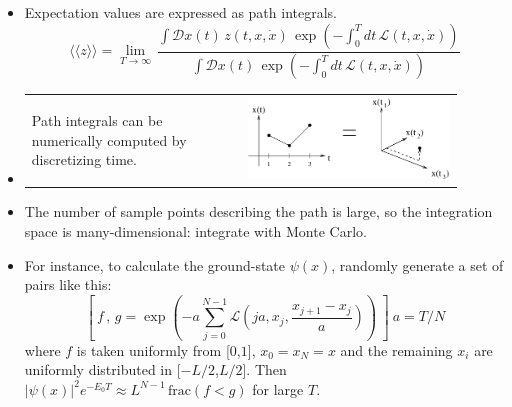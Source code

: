 \begin{slide*}

\slideframe{}
\LARGE


\vfill

\begin{itemize}

  \item Expectation values are expressed as path integrals.
\[ \langle\langle z \rangle\rangle =
   \lim_{T \to \infty} \, 
   \frac{\displaystyle \int {\mathcal D} x(t) \, z(t,x,\dot{x}) \,
   \exp \left(-\int_0^T dt \, {\mathcal L}(t,x,\dot{x})\right)}{\displaystyle
   \int {\mathcal D} x(t) \,
   \exp \left(-\int_0^T dt \, {\mathcal L}(t,x,\dot{x})\right)}
\]

  \vfill

  \item
    \begin{tabular}{p{0.45\linewidth} p{0.45\linewidth}}
      \begin{minipage}{\linewidth}
  	Path integrals can be numerically computed by discretizing time.
      \end{minipage} &
      \begin{minipage}{\linewidth}
  	\includegraphics[width=\linewidth]{timesteps.eps}
      \end{minipage}
    \end{tabular}

  \vfill

  \item The number of sample points describing the path is large, so
  the integration space is many-dimensional: integrate with Monte
  Carlo.

  \vfill

  \item For instance, to calculate the ground-state $\psi(x)$,
  randomly generate a set of pairs like this:
\[ \left[ \ f\, ,\, g = \exp\left(-a\sum_{j=0}^{N-1}
             {\mathcal L}\left(ja, x_j, \frac{x_{j+1} - x_j}{
                          a}\right)\right) \ \right] \ a = T/N
\]
  where $f$ is taken uniformly from [$0$,$1$], $x_0 = x_N = x$ and the
  remaining $x_i$ are uniformly distributed in [$-L/2$,$L/2$]. Then
  $\left| \psi(x) \right|^2 e^{-E_0 T} \approx L^{N-1} \,
  \mbox{frac}(f<g)$ for large $T$.

\end{itemize}

\vfill

\end{slide*}

